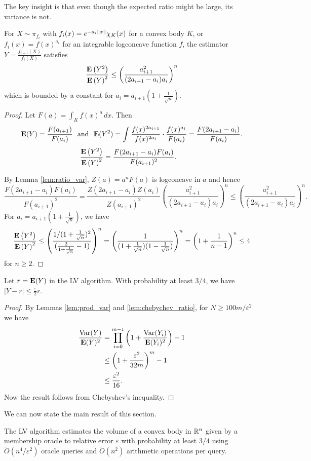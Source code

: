 The key insight is that even though the expected ratio might be large,
its variance is not.
\begin{lem}
\label{lem:chebychev_ratio} For $X\sim\pi_{f_{i}}$ with $f_{i}(x)=e^{-a_{i}\left\Vert x\right\Vert}\chi_{K}(x)$
for a convex body $K$, or $f_{i}(x)=f(x)^{a_{i}}$ for an integrable
logconcave function $f$, the estimator $Y=\frac{f_{i+1}(X)}{f_{i}(X)}$
satisfies 
\[
\frac{\mathbf{E}\left(Y^{2}\right)}{\mathbf{E}\left(Y\right)^{2}}\le\left(\frac{a^{2}_{i+1}}{(2a_{i+1}-a_{i})a_{i}}\right)^{n}
\]
which is bounded by a constant for $a_{i}=a_{i+1}\left(1+\frac{1}{\sqrt{n}}\right)$.
\end{lem}

\begin{proof}
Let $F(a)=\int_{K}f(x)^{a}\,dx$. Then
\[
\E(Y)=\frac{F(a_{i+1})}{F(a_{i})}\ \mbox{ and }\ \E(Y^{2})=\int\frac{f(x)^{2a_{i+1}}}{f(x)^{2a_{i}}}\cdot\frac{f(x)^{a_{i}}}{F(a_{i})}=\frac{F(2a_{i+1}-a_{i})}{F(a_{i})}.
\]
\begin{align*}
\frac{\mathbf{E}\left(Y^{2}\right)}{\mathbf{E}\left(Y\right)^{2}} & =\frac{F(2a_{i+1}-a_{i})F(a_{i})}{F(a_{i+1})^{2}}.
\end{align*}

By Lemma \ref{lem:ratio_var}, $Z(a)=a^{n}F(a)$ is logconcave in
$a$ and hence
\[
\frac{F(2a_{i+1}-a_{i})F(a_{i})}{F(a_{i+1})^{2}}=\frac{Z(2a_{i+1}-a_{i})Z(a_{i})}{Z(a_{i+1})^{2}}\left(\frac{a^{2}_{i+1}}{(2a_{i+1}-a_{i})a_{i}}\right)^{n}\le\left(\frac{a^{2}_{i+1}}{(2a_{i+1}-a_{i})a_{i}}\right)^{n}.
\]
For $a_{i}=a_{i+1}(1+\frac{1}{\sqrt{n}})$, we have 
\[
\frac{\mathbf{E}\left(Y^{2}\right)}{\mathbf{E}\left(Y\right)^{2}}\le\left(\frac{1/(1+\frac{1}{\sqrt{n}})^{2}}{(\frac{2}{1+\frac{1}{\sqrt{n}}}-1)}\right)^{n}=\left(\frac{1}{(1+\frac{1}{\sqrt{n}})(1-\frac{1}{\sqrt{n}})}\right)^{n}=\left(1+\frac{1}{n-1}\right)^{n}\le4
\]
 for $n\ge2.$ 
\end{proof}
\begin{thm}
Let $r=\mathbf{E}(Y)$ in the LV algorithm. With probability at least $3/4$,
we have $\left|Y-r\right|\le\frac{\varepsilon}{2}r$. 
\end{thm}

\begin{proof}
By Lemmas \ref{lem:prod_var} and \ref{lem:chebychev_ratio}, for
$N\geq100m/\varepsilon^{2}$ we have 
\begin{align*}
\frac{\mathrm{Var}(Y)}{\mathbf{E}(Y)^{2}} & =\prod^{m-1}_{i=0}\left(1+\frac{\mathrm{Var}(Y_{i})}{\mathbf{E}(Y_{i})^{2}}\right)-1\\
 & \le\left(1+\frac{\varepsilon^{2}}{32m}\right)^{m}-1\\
 & \le\frac{\varepsilon^{2}}{16}.
\end{align*}
Now the result follows from Chebyshev's inequality. 
\end{proof}
We can now state the main result of this section.
\begin{thm}[\cite{LV2003}]
The LV algorithm estimates the volume of a convex body in $\mathbb{R}^{n}$
given by a membership oracle to relative error $\varepsilon$ with
probability at least $3/4$ using $\widetilde{O}(n^{4}/\varepsilon^{2})$
oracle queries and $\widetilde{O}(n^{2})$ arithmetic operations per
query.
\end{thm}

